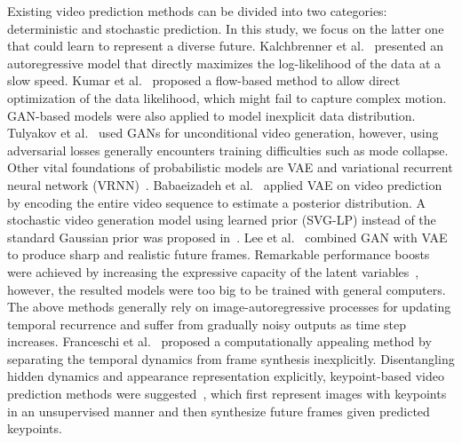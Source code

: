 \documentclass[letterpaper, 10 pt, conference]{ieeeconf}
\begin{document}
Existing video prediction methods can be divided into two categories: deterministic and stochastic prediction.
In this study, we focus on the latter one that could learn to represent a diverse future.
Kalchbrenner et al.~\cite{kalchbrenner2017video} presented an autoregressive model that directly maximizes the log-likelihood of the data at a slow speed.
Kumar et al.~\cite{kumar2020videoflow} proposed
a flow-based method to allow direct optimization of the data likelihood, which might fail to capture complex motion. 
GAN-based models were also applied to model inexplicit data distribution.
Tulyakov et al.~\cite{tulyakov2018mocogan} used GANs for unconditional video generation, however, using adversarial losses generally encounters training difficulties such as mode collapse.
Other vital foundations of probabilistic models are VAE and variational recurrent neural network (VRNN)~\cite{chung2015recurrent}.
Babaeizadeh et al.~\cite{babaeizadeh2018stochastic} applied VAE on video prediction by encoding the entire video sequence to estimate a posterior distribution.
A stochastic video generation model using learned prior (SVG-LP) instead of the standard Gaussian prior was proposed in~\cite{denton2018stochastic}.  Lee et al.~\cite{lee2018stochastic} combined GAN with VAE to produce sharp and realistic future frames.
Remarkable performance boosts were achieved by increasing the expressive capacity of the latent variables~\cite{castrejon2019improved,villegas2019high}, however, the resulted models were too big to be trained with general computers. 
The above methods generally rely on image-autoregressive processes for updating temporal recurrence and suffer from gradually noisy outputs as time step increases.
Franceschi et al.~\cite{franceschi2020stochastic} proposed a computationally appealing method by separating the temporal dynamics from frame synthesis inexplicitly.
Disentangling hidden dynamics and appearance representation explicitly, keypoint-based video prediction methods were suggested~\cite{minderer2019unsupervised,kim2019unsupervised}, which first represent images with keypoints in an unsupervised manner and then synthesize future frames given predicted keypoints.
 
\end{document}
